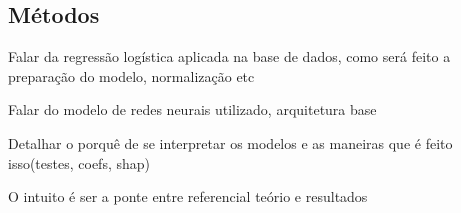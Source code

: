 

\subsection{Métodos}

Falar da regressão logística aplicada na base de dados,
como será feito a preparação do modelo, normalização etc

Falar do modelo de redes neurais utilizado, arquitetura base

Detalhar o porquê de se interpretar os modelos e as maneiras
que é feito isso(testes, coefs, shap)

O intuito é ser a ponte entre referencial teório e resultados
